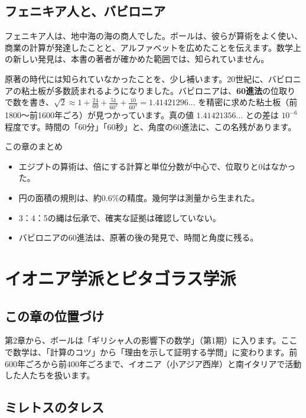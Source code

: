 \documentclass[a4paper,11pt,openany]{ltjsbook}
\begin{document}
\section{フェニキア人と、バビロニア}

フェニキア人は、地中海の海の商人でした。ボールは、彼らが算術をよく使い、商業の計算が発達したことと、アルファベットを広めたことを伝えます。数学上の新しい発見は、本書の著者が確かめた範囲では、知られていません。

原著の時代には知られていなかったことを、少し補います。20世紀に、バビロニアの粘土板が多数読まれるようになりました。バビロニアは、\textbf{60進法}の位取りで数を書き、$\sqrt2\approx 1+\tfrac{24}{60}+\tfrac{51}{60^2}+\tfrac{10}{60^3}=1.41421296\ldots$ を精密に求めた粘土板（前1800〜前1600年ごろ）が見つかっています。真の値 $1.41421356\ldots$ との差は $10^{-6}$ 程度です。時間の「60分」「60秒」と、角度の60進法に、この名残があります。

\begin{pointbox}{この章のまとめ}
\begin{itemize}[leftmargin=*]
\item エジプトの算術は、倍にする計算と単位分数が中心で、位取りと0はなかった。
\item 円の面積の規則は、約0.6\%の精度。幾何学は測量から生まれた。
\item 3：4：5の縄は伝承で、確実な証拠は確認していない。
\item バビロニアの60進法は、原著の後の発見で、時間と角度に残る。
\end{itemize}
\end{pointbox}

\chapter{イオニア学派とピタゴラス学派}

\section{この章の位置づけ}

第2章から、ボールは「ギリシャ人の影響下の数学」（第1期）に入ります。ここで数学は、「計算のコツ」から「理由を示して証明する学問」に変わります。前600年ごろから前400年ごろまで、イオニア（小アジア西岸）と南イタリアで活動した人たちを扱います。

\section{ミレトスのタレス}
\end{document}
